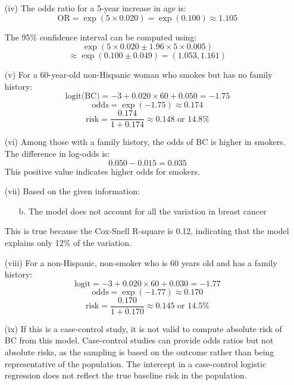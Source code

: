 \documentclass{article}
\begin{document}
\begin{enumerate}
    \item[(iv)] The odds ratio for a 5-year increase in age is:
    \[ \text{OR} = \exp(5 \times 0.020) = \exp(0.100) \approx 1.105 \]
    
    The 95\% confidence interval can be computed using:
    \[ \exp(5 \times 0.020 \pm 1.96 \times 5 \times 0.005) \]
    \[ \approx \exp(0.100 \pm 0.049) = (1.053, 1.161) \]

    \item[(v)] For a 60-year-old non-Hispanic woman who smokes but has no family history:
    \[ \text{logit(BC)} = -3 + 0.020 \times 60 + 0.050 = -1.75 \]
    \[ \text{odds} = \exp(-1.75) \approx 0.174 \]
    \[ \text{risk} = \frac{0.174}{1 + 0.174} \approx 0.148 \text{ or } 14.8\% \]

    \item[(vi)] Among those with a family history, the odds of BC is higher in smokers. The difference in log-odds is:
    \[ 0.050 - 0.015 = 0.035 \]
    This positive value indicates higher odds for smokers.

    \item[(vii)] Based on the given information:
    \begin{itemize}
        \item[b.] The model does not account for all the variation in breast cancer
    \end{itemize}
    This is true because the Cox-Snell R-square is 0.12, indicating that the model explains only 12\% of the variation.

    \item[(viii)] For a non-Hispanic, non-smoker who is 60 years old and has a family history:
    \[ \text{logit} = -3 + 0.020 \times 60 + 0.030 = -1.77 \]
    \[ \text{odds} = \exp(-1.77) \approx 0.170 \]
    \[ \text{risk} = \frac{0.170}{1 + 0.170} \approx 0.145 \text{ or } 14.5\% \]

    \item[(ix)] If this is a case-control study, it is not valid to compute absolute risk of BC from this model. Case-control studies can provide odds ratios but not absolute risks, as the sampling is based on the outcome rather than being representative of the population. The intercept in a case-control logistic regression does not reflect the true baseline risk in the population.
\end{enumerate}

\newpage
\end{document}
